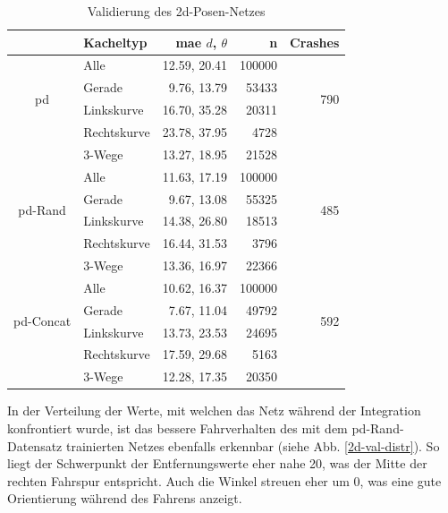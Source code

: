 \begin{table}[H]
	\centering
	\begin{tabular}[t]{|c|l|r|r|r|}
		\hline
		& \textbf{Kacheltyp} & \textbf{\acs{mae} $d$, $\theta$} & \textbf{n} & \textbf{Crashes} \\
		\hline
		\multirow{4}{*}{\acs{pd}} 
		& Alle
		& 12.59, 20.41
		& 100000
		& \multirow{4}{*}{790}\\
		\cline{2-4}
		& Gerade
		&  9.76, 13.79
		& 53433
		&\\
		\cline{2-4}
		& Linkskurve
		& 16.70,  35.28
		& 20311
		&\\
		\cline{2-4}
		& Rechtskurve
		& 23.78, 37.95 
		& 4728
		&\\
		\cline{2-4}
		& 3-Wege
		&  13.27, 18.95
		& 21528
		&\\
		\hline
		\multirow{4}{*}{\acs{pd}-Rand} 
		& Alle
		& 11.63, 17.19
		& 100000
		& \multirow{4}{*}{485}\\
		\cline{2-4}
		& Gerade
		&  9.67, 13.08
		& 55325 & \\
		\cline{2-4}
		& Linkskurve
		& 14.38, 26.80
		& 18513
		&\\
		\cline{2-4}
		& Rechtskurve
		& 16.44, 31.53
		& 3796
		&\\
		\cline{2-4}
		& 3-Wege
		& 13.36, 16.97
		& 22366
		&\\
		\hline
		\multirow{4}{*}{\acs{pd}-Concat} 
		& Alle
		& 10.62, 16.37
		& 100000
		& \multirow{4}{*}{592}\\
		\cline{2-4}
		& Gerade
		& 7.67, 11.04
		& 49792
		&\\
		\cline{2-4}
		& Linkskurve
		& 13.73, 23.53
		& 24695
		&\\
		\cline{2-4}
		& Rechtskurve
		& 17.59, 29.68
		& 5163
		&\\
		\cline{2-4}
		& 3-Wege
		& 12.28, 17.35
		& 20350
		&\\
		\hline
	\end{tabular}
	\caption{Validierung des \acs{2d}-Posen-Netzes}
	\label{2d-validation}
\end{table}

In der Verteilung der Werte, mit welchen das Netz während der Integration konfrontiert wurde, ist das bessere Fahrverhalten des mit dem \glqq\acs{pd}-Rand\grqq-Datensatz trainierten Netzes ebenfalls erkennbar (siehe Abb. \ref{2d-val-distr}). So liegt der Schwerpunkt der Entfernungswerte eher nahe 20, was der Mitte der rechten Fahrspur entspricht. Auch die Winkel streuen eher um 0, was eine gute Orientierung während des Fahrens anzeigt.

